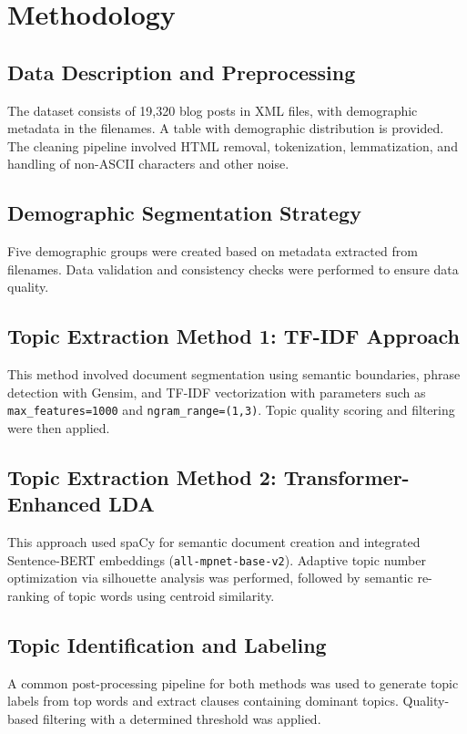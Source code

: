 \documentclass[conference]{IEEEtran}
\begin{document}
\section{Methodology}
\subsection{Data Description and Preprocessing}
The dataset consists of 19,320 blog posts in XML files, with demographic metadata in the filenames. A table with demographic distribution is provided. The cleaning pipeline involved HTML removal, tokenization, lemmatization, and handling of non-ASCII characters and other noise.

\subsection{Demographic Segmentation Strategy}
Five demographic groups were created based on metadata extracted from filenames. Data validation and consistency checks were performed to ensure data quality.

\subsection{Topic Extraction Method 1: TF-IDF Approach}
This method involved document segmentation using semantic boundaries, phrase detection with Gensim, and TF-IDF vectorization with parameters such as \texttt{max\_features=1000} and \texttt{ngram\_range=(1,3)}. Topic quality scoring and filtering were then applied.

\subsection{Topic Extraction Method 2: Transformer-Enhanced LDA}
This approach used spaCy for semantic document creation and integrated Sentence-BERT embeddings (\texttt{all-mpnet-base-v2}). Adaptive topic number optimization via silhouette analysis was performed, followed by semantic re-ranking of topic words using centroid similarity.

\subsection{Topic Identification and Labeling}
A common post-processing pipeline for both methods was used to generate topic labels from top words and extract clauses containing dominant topics. Quality-based filtering with a determined threshold was applied.
\end{document}
